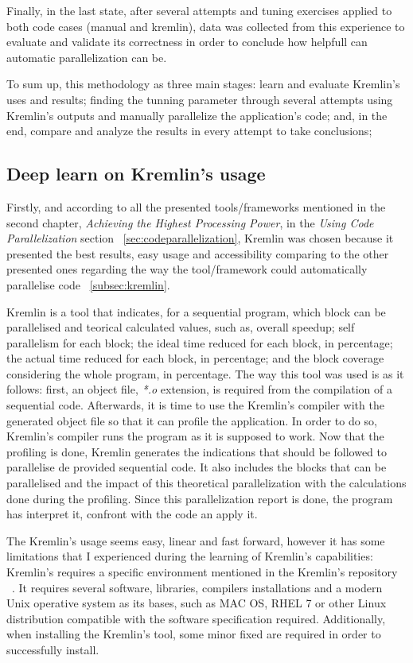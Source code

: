 Finally, in the last state, after several attempts and tuning exercises applied to both code cases (manual and kremlin), data was collected from this experience to evaluate and validate its correctness in order to conclude how helpfull can automatic parallelization can be.

To sum up, this methodology as three main stages: learn and evaluate  Kremlin's uses and results; finding the tunning parameter through several attempts using Kremlin's outputs and manually parallelize the application's code; and, in the end, compare and analyze the results in every attempt to take conclusions; 


\subsection{Deep learn on Kremlin's usage}

Firstly, and according to all the presented tools/frameworks mentioned in the second chapter, \textit{Achieving the Highest Processing Power}, in the \textit{Using Code Parallelization} section ~\ref{sec:codeparallelization}, Kremlin was chosen because it presented the best results, easy usage and accessibility comparing to the other presented ones regarding the way the tool/framework could automatically parallelise code ~\ref{subsec:kremlin}.

Kremlin is a tool that indicates, for a sequential program, which block can be parallelised and teorical calculated values, such as, overall speedup; self parallelism for each block; the ideal time reduced for each block, in percentage; the actual time reduced for each block, in percentage; and the block coverage considering the whole program, in percentage. The way this tool was used is as it follows: first, an object file, \textit{*.o} extension, is required from the compilation of a sequential code. Afterwards, it is time to use the Kremlin's compiler with the generated object file so that it can profile the application. In order to do so, Kremlin's compiler runs the program as it is supposed to work. Now that the profiling is done, Kremlin generates the indications that should be followed to parallelise de provided sequential code. It also includes the blocks that can be parallelised and the impact of this theoretical parallelization with the calculations done during the profiling. Since this parallelization report is done, the program has interpret it, confront with the code an apply it.

The Kremlin's usage seems easy, linear and fast forward, however it has some limitations that I experienced during the learning of Kremlin's capabilities: Kremlin's requires a specific environment mentioned in the Kremlin's repository ~\cite{KremlinRep}. It requires several software, libraries, compilers installations and a modern Unix operative system as its bases, such as MAC OS, RHEL 7 or other Linux distribution compatible with the software specification required. Additionally, when installing the Kremlin's tool, some minor fixed are required in order to successfully install.


